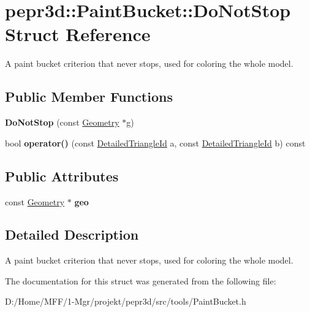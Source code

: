 \hypertarget{structpepr3d_1_1_paint_bucket_1_1_do_not_stop}{}\section{pepr3d\+::Paint\+Bucket\+::Do\+Not\+Stop Struct Reference}
\label{structpepr3d_1_1_paint_bucket_1_1_do_not_stop}


A paint bucket criterion that never stops, used for coloring the whole model.  


\subsection*{Public Member Functions}
\begin{DoxyCompactItemize}
\item 
\mbox{\label{structpepr3d_1_1_paint_bucket_1_1_do_not_stop_ab95dbddc4d5d645b8b347351f3c4ee77}} 
{\bfseries Do\+Not\+Stop} (const \mbox{\hyperlink{classpepr3d_1_1_geometry}{Geometry}} $\ast$g)
\item 
\mbox{\label{structpepr3d_1_1_paint_bucket_1_1_do_not_stop_a5255a131c1d4517545b5c44f24544d79}} 
bool {\bfseries operator()} (const \mbox{\hyperlink{structpepr3d_1_1_detailed_triangle_id}{Detailed\+Triangle\+Id}} a, const \mbox{\hyperlink{structpepr3d_1_1_detailed_triangle_id}{Detailed\+Triangle\+Id}} b) const
\end{DoxyCompactItemize}
\subsection*{Public Attributes}
\begin{DoxyCompactItemize}
\item 
\mbox{\label{structpepr3d_1_1_paint_bucket_1_1_do_not_stop_a78cccca6027d2a3dba5729692124ff14}} 
const \mbox{\hyperlink{classpepr3d_1_1_geometry}{Geometry}} $\ast$ {\bfseries geo}
\end{DoxyCompactItemize}


\subsection{Detailed Description}
A paint bucket criterion that never stops, used for coloring the whole model. 

The documentation for this struct was generated from the following file\+:\begin{DoxyCompactItemize}
\item 
D\+:/\+Home/\+M\+F\+F/1-\/\+Mgr/projekt/pepr3d/src/tools/Paint\+Bucket.\+h\end{DoxyCompactItemize}
